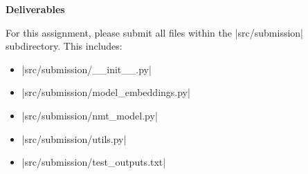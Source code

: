 \textbf{Deliverables}

For this assignment, please submit all files within the |src/submission| subdirectory.  This includes:
\begin{itemize}
    \item |src/submission/__init__.py|
    \item |src/submission/model_embeddings.py|
    \item |src/submission/nmt_model.py|
    \item |src/submission/utils.py|
    \item |src/submission/test_outputs.txt|
\end{itemize}   

